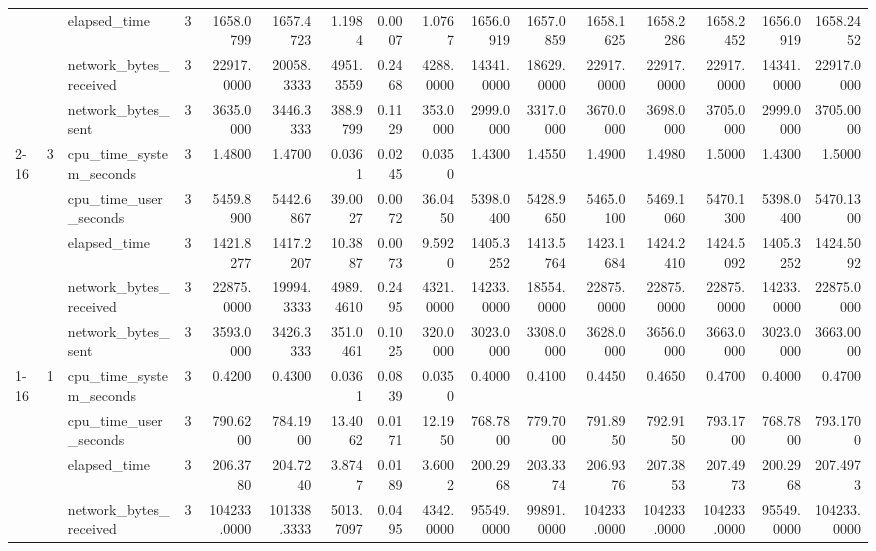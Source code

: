 \begin{tabular}{lllrrrrrrrrrrrrr}
 &  & elapsed\_time & 3 & 1658.0799 & 1657.4723 & 1.1984 & 0.0007 & 1.0767 & 1656.0919 & 1657.0859 & 1658.1625 & 1658.2286 & 1658.2452 & 1656.0919 & 1658.2452 \\
 &  & network\_bytes\_received & 3 & 22917.0000 & 20058.3333 & 4951.3559 & 0.2468 & 4288.0000 & 14341.0000 & 18629.0000 & 22917.0000 & 22917.0000 & 22917.0000 & 14341.0000 & 22917.0000 \\
 &  & network\_bytes\_sent & 3 & 3635.0000 & 3446.3333 & 388.9799 & 0.1129 & 353.0000 & 2999.0000 & 3317.0000 & 3670.0000 & 3698.0000 & 3705.0000 & 2999.0000 & 3705.0000 \\
\cline{2-16}
 & \multirow[t]{5}{*}{3} & cpu\_time\_system\_seconds & 3 & 1.4800 & 1.4700 & 0.0361 & 0.0245 & 0.0350 & 1.4300 & 1.4550 & 1.4900 & 1.4980 & 1.5000 & 1.4300 & 1.5000 \\
 &  & cpu\_time\_user\_seconds & 3 & 5459.8900 & 5442.6867 & 39.0027 & 0.0072 & 36.0450 & 5398.0400 & 5428.9650 & 5465.0100 & 5469.1060 & 5470.1300 & 5398.0400 & 5470.1300 \\
 &  & elapsed\_time & 3 & 1421.8277 & 1417.2207 & 10.3887 & 0.0073 & 9.5920 & 1405.3252 & 1413.5764 & 1423.1684 & 1424.2410 & 1424.5092 & 1405.3252 & 1424.5092 \\
 &  & network\_bytes\_received & 3 & 22875.0000 & 19994.3333 & 4989.4610 & 0.2495 & 4321.0000 & 14233.0000 & 18554.0000 & 22875.0000 & 22875.0000 & 22875.0000 & 14233.0000 & 22875.0000 \\
 &  & network\_bytes\_sent & 3 & 3593.0000 & 3426.3333 & 351.0461 & 0.1025 & 320.0000 & 3023.0000 & 3308.0000 & 3628.0000 & 3656.0000 & 3663.0000 & 3023.0000 & 3663.0000 \\
\cline{1-16} \cline{2-16}
\multirow[t]{15}{*}{national-scale-spatial-join-duckdb-small} & \multirow[t]{5}{*}{1} & cpu\_time\_system\_seconds & 3 & 0.4200 & 0.4300 & 0.0361 & 0.0839 & 0.0350 & 0.4000 & 0.4100 & 0.4450 & 0.4650 & 0.4700 & 0.4000 & 0.4700 \\
 &  & cpu\_time\_user\_seconds & 3 & 790.6200 & 784.1900 & 13.4062 & 0.0171 & 12.1950 & 768.7800 & 779.7000 & 791.8950 & 792.9150 & 793.1700 & 768.7800 & 793.1700 \\
 &  & elapsed\_time & 3 & 206.3780 & 204.7240 & 3.8747 & 0.0189 & 3.6002 & 200.2968 & 203.3374 & 206.9376 & 207.3853 & 207.4973 & 200.2968 & 207.4973 \\
 &  & network\_bytes\_received & 3 & 104233.0000 & 101338.3333 & 5013.7097 & 0.0495 & 4342.0000 & 95549.0000 & 99891.0000 & 104233.0000 & 104233.0000 & 104233.0000 & 95549.0000 & 104233.0000 \\

\end{tabular}
